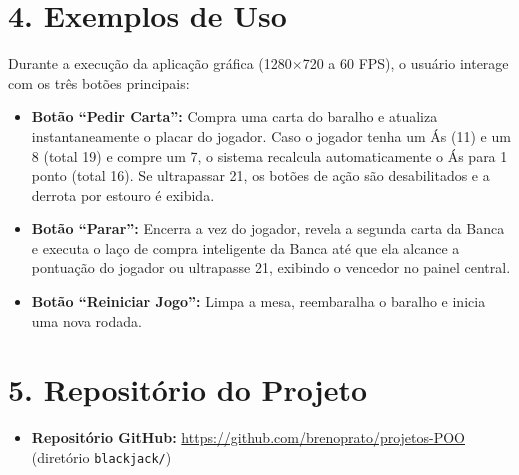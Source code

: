 \documentclass[10pt,a4paper]{article}
\begin{document}
\section*{4. Exemplos de Uso}

Durante a execução da aplicação gráfica (1280$\times$720 a 60 FPS), o usuário interage com os três botões principais:
\begin{itemize}
    \item \textbf{Botão ``Pedir Carta'':} Compra uma carta do baralho e atualiza instantaneamente o placar do jogador. Caso o jogador tenha um Ás (11) e um 8 (total 19) e compre um 7, o sistema recalcula automaticamente o Ás para 1 ponto (total 16). Se ultrapassar 21, os botões de ação são desabilitados e a derrota por estouro é exibida.
    \item \textbf{Botão ``Parar'':} Encerra a vez do jogador, revela a segunda carta da Banca e executa o laço de compra inteligente da Banca até que ela alcance a pontuação do jogador ou ultrapasse 21, exibindo o vencedor no painel central.
    \item \textbf{Botão ``Reiniciar Jogo'':} Limpa a mesa, reembaralha o baralho e inicia uma nova rodada.
\end{itemize}

\section*{5. Repositório do Projeto}
\begin{itemize}
    \item \textbf{Repositório GitHub:} \url{https://github.com/brenoprato/projetos-POO} (diretório \texttt{blackjack/})
\end{itemize}
\end{document}
